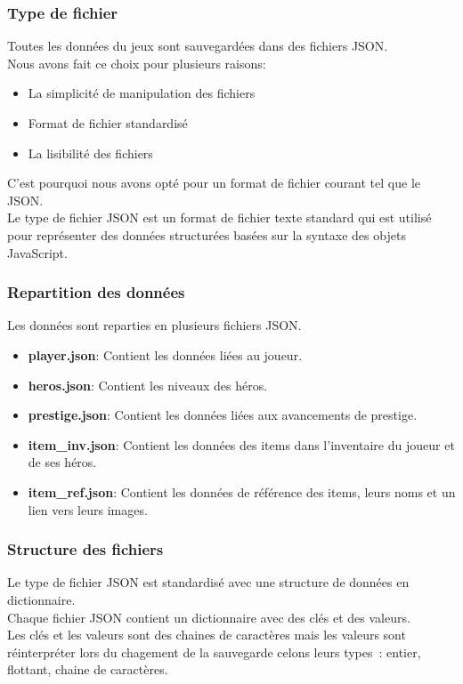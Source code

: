 \documentclass[11pt,a4paper]{article}
\begin{document}
\subsubsection{Type de fichier}
Toutes les données du jeux sont sauvegardées dans des fichiers JSON.\\
Nous avons fait ce choix pour plusieurs raisons:
\begin{itemize}
    \item La simplicité de manipulation des fichiers
    \item Format de fichier standardisé
    \item La lisibilité des fichiers
\end{itemize}
C'est pourquoi nous avons opté pour un format de fichier courant tel que le JSON.\\
Le type de fichier JSON est un format de fichier texte standard qui est utilisé pour représenter des données structurées basées sur la syntaxe des objets JavaScript. 

\subsubsection{Repartition des données}
Les données sont reparties en plusieurs fichiers JSON.
\begin{itemize}
    \item \textbf{player.json}: Contient les données liées au joueur.
    \item \textbf{heros.json}: Contient les niveaux des héros.
    \item \textbf{prestige.json}: Contient les données liées aux avancements de prestige.
    \item \textbf{item\_inv.json}: Contient les données des items dans l'inventaire du joueur et de ses héros.
    \item \textbf{item\_ref.json}: Contient les données de référence des items, leurs noms et un lien vers leurs images.
\end{itemize}

\subsubsection{Structure des fichiers}
Le type de fichier JSON est standardisé avec une structure de données en dictionnaire.\\
Chaque fichier JSON contient un dictionnaire avec des clés et des valeurs.\\
Les clés et les valeurs sont des chaines de caractères mais les valeurs sont réinterpréter lors du chagement de la sauvegarde celons leurs types~: entier, flottant, chaine de caractères.\\
\end{document}
